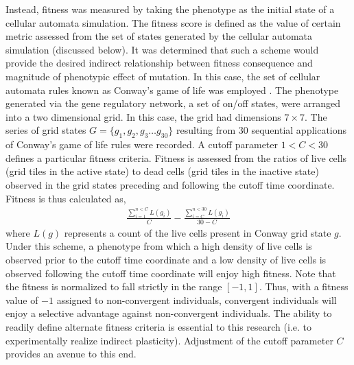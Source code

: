 Instead, fitness was measured by taking the phenotype as the initial state of a cellular automata simulation.
The fitness score is defined as the value of certain metric assessed from the set of states generated by the cellular automata simulation  (discussed below).
It was determined that such a scheme would provide the desired indirect relationship between fitness consequence and magnitude of phenotypic effect of mutation.
In this case, the set of cellular automata rules known as Conway's game of life was employed \cite{Conway1970TheLife}.
The phenotype generated via the gene regulatory network, a set of on/off states, were arranged into a two dimensional grid.
In this case, the grid had dimensions $7 \times 7$.
The series of grid states $G = \{g_1, g_2, g_3 \ldots g_30\}$ resulting from 30 sequential applications of Conway's game of life rules were recorded.
A cutoff parameter $1 < C < 30$ defines a particular fitness criteria.
Fitness is assessed from the ratios of live cells (grid tiles in the active state) to dead cells (grid tiles in the inactive state) observed in the grid states preceding and following the cutoff time coordinate.
Fitness is thus calculated as,
\begin{align*}
\frac{\sum_{i=1}^{n<C} L(g_i)}{C} - \frac{\sum_{i=C}^{n<30} L(g_i)}{30 - C}
\end{align*}
where $L(g)$ represents a count of the live cells present in Conway grid state $g$.
Under this scheme, a phenotype from which a high density of live cells is observed prior to the cutoff time coordinate and a low density of live cells is observed following the cutoff time coordinate will enjoy high fitness.
Note that the fitness is normalized to fall strictly in the range $[-1, 1]$.
Thus, with a fitness value of $-1$ assigned to non-convergent individuals, convergent individuals will enjoy a selective advantage against non-convergent individuals.
The ability to readily define alternate fitness criteria is essential to this research (i.e. to experimentally realize indirect plasticity).
Adjustment of the cutoff parameter $C$ provides an avenue to this end.

